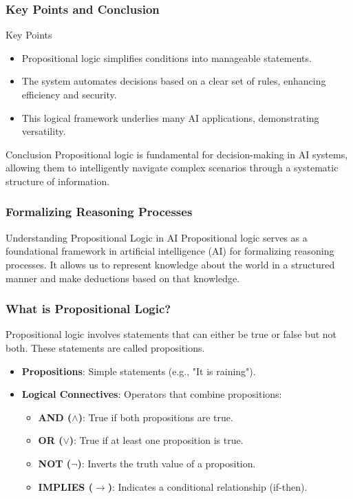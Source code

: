 \documentclass[aspectratio=169]{beamer}
\begin{document}
\begin{frame}[fragile]
    \frametitle{Key Points and Conclusion}
    \begin{block}{Key Points}
        \begin{itemize}
            \item Propositional logic simplifies conditions into manageable statements.
            \item The system automates decisions based on a clear set of rules, enhancing efficiency and security.
            \item This logical framework underlies many AI applications, demonstrating versatility.
        \end{itemize}
    \end{block}

    \begin{block}{Conclusion}
        Propositional logic is fundamental for decision-making in AI systems, allowing them to intelligently navigate complex scenarios through a systematic structure of information.
    \end{block}
\end{frame}

\begin{frame}[fragile]
    \frametitle{Formalizing Reasoning Processes}
    \begin{block}{Understanding Propositional Logic in AI}
        Propositional logic serves as a foundational framework in artificial intelligence (AI) for formalizing reasoning processes. 
        It allows us to represent knowledge about the world in a structured manner and make deductions based on that knowledge.
    \end{block}
\end{frame}

\begin{frame}[fragile]
    \frametitle{What is Propositional Logic?}
    Propositional logic involves statements that can either be true or false but not both. These statements are called propositions.
    
    \begin{itemize}
        \item \textbf{Propositions}: Simple statements (e.g., "It is raining").
        \item \textbf{Logical Connectives}: Operators that combine propositions:
            \begin{itemize}
                \item \textbf{AND ($\land$)}: True if both propositions are true.
                \item \textbf{OR ($\lor$)}: True if at least one proposition is true.
                \item \textbf{NOT ($\neg$)}: Inverts the truth value of a proposition.
                \item \textbf{IMPLIES ($\rightarrow$)}: Indicates a conditional relationship (if-then).
            \end{itemize}
    \end{itemize}
\end{frame}
\end{document}

